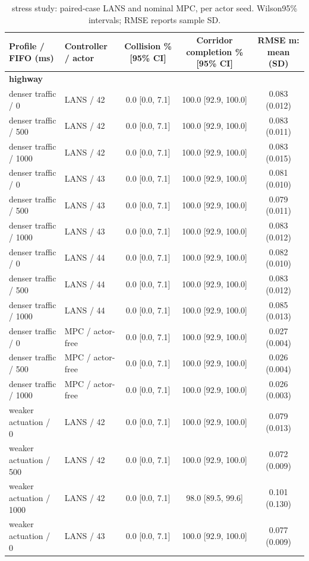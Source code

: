 \begin{longtable}{llccc}
\caption{stress study: paired-case LANS and nominal MPC, per actor seed. Wilson95\% intervals; RMSE reports sample SD.}\\
\toprule
Profile / FIFO (ms) & Controller / actor & Collision \% [95\% CI] & Corridor completion \% [95\% CI] & RMSE m: mean (SD) \\
\midrule
\multicolumn{5}{l}{\textbf{highway}} \\
denser traffic / 0 & LANS / 42 & 0.0 [0.0, 7.1] & 100.0 [92.9, 100.0] & 0.083 (0.012) \\
denser traffic / 500 & LANS / 42 & 0.0 [0.0, 7.1] & 100.0 [92.9, 100.0] & 0.083 (0.011) \\
denser traffic / 1000 & LANS / 42 & 0.0 [0.0, 7.1] & 100.0 [92.9, 100.0] & 0.083 (0.015) \\
denser traffic / 0 & LANS / 43 & 0.0 [0.0, 7.1] & 100.0 [92.9, 100.0] & 0.081 (0.010) \\
denser traffic / 500 & LANS / 43 & 0.0 [0.0, 7.1] & 100.0 [92.9, 100.0] & 0.079 (0.011) \\
denser traffic / 1000 & LANS / 43 & 0.0 [0.0, 7.1] & 100.0 [92.9, 100.0] & 0.083 (0.012) \\
denser traffic / 0 & LANS / 44 & 0.0 [0.0, 7.1] & 100.0 [92.9, 100.0] & 0.082 (0.010) \\
denser traffic / 500 & LANS / 44 & 0.0 [0.0, 7.1] & 100.0 [92.9, 100.0] & 0.083 (0.012) \\
denser traffic / 1000 & LANS / 44 & 0.0 [0.0, 7.1] & 100.0 [92.9, 100.0] & 0.085 (0.013) \\
denser traffic / 0 & MPC / actor-free & 0.0 [0.0, 7.1] & 100.0 [92.9, 100.0] & 0.027 (0.004) \\
denser traffic / 500 & MPC / actor-free & 0.0 [0.0, 7.1] & 100.0 [92.9, 100.0] & 0.026 (0.004) \\
denser traffic / 1000 & MPC / actor-free & 0.0 [0.0, 7.1] & 100.0 [92.9, 100.0] & 0.026 (0.003) \\
weaker actuation / 0 & LANS / 42 & 0.0 [0.0, 7.1] & 100.0 [92.9, 100.0] & 0.079 (0.013) \\
weaker actuation / 500 & LANS / 42 & 0.0 [0.0, 7.1] & 100.0 [92.9, 100.0] & 0.072 (0.009) \\
weaker actuation / 1000 & LANS / 42 & 0.0 [0.0, 7.1] & 98.0 [89.5, 99.6] & 0.101 (0.130) \\
weaker actuation / 0 & LANS / 43 & 0.0 [0.0, 7.1] & 100.0 [92.9, 100.0] & 0.077 (0.009) \\

\end{longtable}
